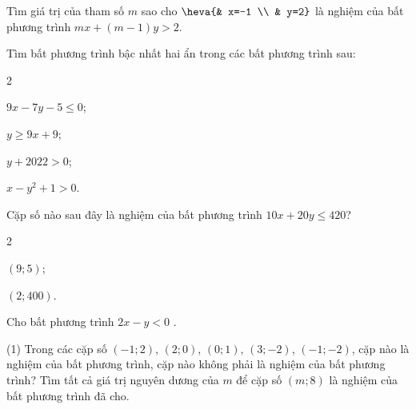 \begin{bt}%
Tìm giá trị của tham số $m$ sao cho $\heva{& x=-1 \\ & y=2}$ là nghiệm của bất phương trình $mx+(m-1)y>2$. 
\end{bt}

\begin{bt}%
	Tìm bất phương trình bậc nhất hai ẩn trong các bất phương trình sau:
	\begin{enumEX}{2}
		\item $9x-7y-5 \leq 0$;
		\item $y \geq 9x+9$;
		\item $y+2022>0$;
		\item $x-y^2+1>0$.
	\end{enumEX}
\end{bt}

\begin{bt}%
	Cặp số nào sau đây là nghiệm của bất phương trình $10x+20y \leq 420$?
	\begin{enumEX}{2}
		\item $(9;5)$;
		\item $(2;400)$.
	\end{enumEX}
\end{bt}

\begin{bt}%
	Cho bất phương trình $2x-y<0$ . 
	\begin{tasks}(1)
		\task Trong các cặp số $(-1;2)$, $\left(2;0\right)$, $(0;1)$, $\left(3;-2\right)$, $(-1;-2)$, cặp nào là nghiệm của bất phương trình, cặp nào không phải là nghiệm của bất phương trình?
		\task Tìm tất cả giá trị nguyên dương của $m$ để cặp số $(m;8)$ là nghiệm của bất phương trình đã cho. 
	\end{tasks}
\end{bt}

